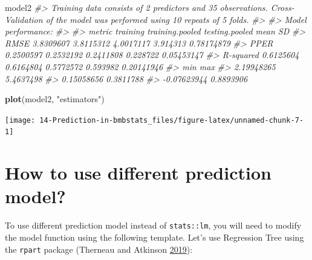 \documentclass[
]{book}
\newenvironment{Shaded}{\begin{snugshade}}{\end{snugshade}}
\newcommand{\CommentTok}[1]{\textcolor[rgb]{0.56,0.35,0.01}{\textit{#1}}}
\newcommand{\KeywordTok}[1]{\textcolor[rgb]{0.13,0.29,0.53}{\textbf{#1}}}
\newcommand{\NormalTok}[1]{#1}
\newcommand{\StringTok}[1]{\textcolor[rgb]{0.31,0.60,0.02}{#1}}
\begin{document}
\begin{Shaded}
\begin{Highlighting}[]
\NormalTok{model2}
\CommentTok{\#> Training data consists of 2 predictors and 35 observations. Cross{-}Validation of the model was performed using 10 repeats of 5 folds.}
\CommentTok{\#> }
\CommentTok{\#> Model performance:}
\CommentTok{\#> }
\CommentTok{\#>     metric  training training.pooled testing.pooled     mean         SD}
\CommentTok{\#>       RMSE 3.8309607       3.8115312      4.0017117 3.914313 0.78174879}
\CommentTok{\#>       PPER 0.2500597       0.2532192      0.2411808 0.228722 0.05453147}
\CommentTok{\#>  R{-}squared 0.6125604       0.6164804      0.5772572 0.593982 0.20141946}
\CommentTok{\#>          min       max}
\CommentTok{\#>   2.19948265 5.4637498}
\CommentTok{\#>   0.15058656 0.3811788}
\CommentTok{\#>  {-}0.07623944 0.8893906}
\end{Highlighting}
\end{Shaded}

\begin{Shaded}
\begin{Highlighting}[]
\KeywordTok{plot}\NormalTok{(model2, }\StringTok{"estimators"}\NormalTok{)}
\end{Highlighting}
\end{Shaded}

\begin{center}\texttt{[image: 14-Prediction-in-bmbstats\_files/figure-latex/unnamed-chunk-7-1]} \end{center}

\hypertarget{how-to-use-different-prediction-model}{%
\section{How to use different prediction model?}\label{how-to-use-different-prediction-model}}

To use different prediction model instead of \texttt{stats::lm}, you will need to modify the model function using the following template. Let's use Regression Tree using the \texttt{rpart} package (Therneau and Atkinson \protect\hyperlink{ref-R-rpart}{2019}):
\end{document}
